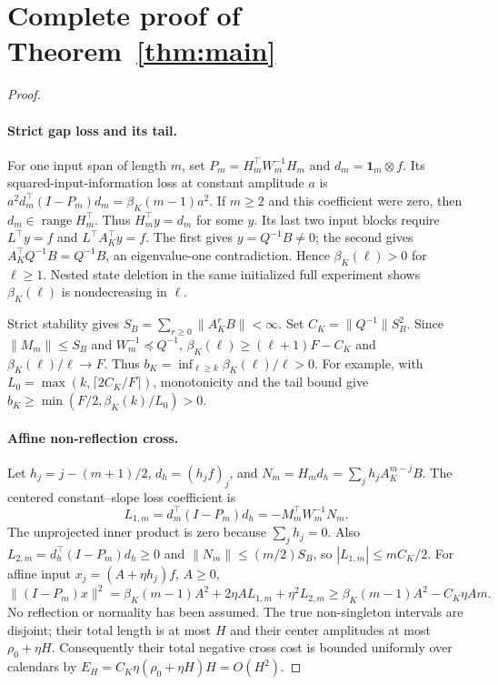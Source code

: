 \documentclass[11pt]{article}
\begin{document}
\appendix
\section{Complete proof of Theorem~\ref{thm:main}}\label{sec:proof}

\begin{proof}
\paragraph{Strict gap loss and its tail.}
For one input span of length $m$, set $P_m=H_m^\top W_m^{-1}H_m$ and
$d_m=\mathbf1_m\otimes f$.
Its squared-input-information loss at constant amplitude $a$ is
$a^2d_m^\top(I-P_m)d_m=\beta_K(m-1)a^2$.
If $m\ge2$ and this coefficient were zero, then $d_m\in\operatorname{range}H_m^\top$.
Thus $H_m^\top y=d_m$ for some $y$. Its last two input blocks require
$L^\top y=f$ and $L^\top A_K^\top y=f$.
The first gives $y=Q^{-1}B\ne0$; the second gives
$A_K^\top Q^{-1}B=Q^{-1}B$, an eigenvalue-one contradiction.
Hence $\beta_K(\ell)>0$ for $\ell\ge1$.
Nested state deletion in the same initialized full experiment shows
$\beta_K(\ell)$ is nondecreasing in $\ell$.

Strict stability gives
$S_B=\sum_{r\ge0}\|A_K^rB\|<\infty$.
Set $C_K=\|Q^{-1}\|S_B^2$.
Since $\|M_m\|\le S_B$ and $W_m^{-1}\preceq Q^{-1}$,
$\beta_K(\ell)\ge(\ell+1)F-C_K$ and $\beta_K(\ell)/\ell\to F$.
Thus $b_K=\inf_{\ell\ge k}\beta_K(\ell)/\ell>0$.
For example, with $L_0=\max(k,\lceil2C_K/F\rceil)$,
monotonicity and the tail bound give
$b_K\ge\min(F/2,\beta_K(k)/L_0)>0$.

\paragraph{Affine non-reflection cross.}
Let $h_j=j-(m+1)/2$, $d_h=(h_jf)_j$, and
$N_m=H_m d_h=\sum_jh_jA_K^{m-j}B$.
The centered constant--slope loss coefficient is
\[
L_{1,m}=d_m^\top(I-P_m)d_h=-M_m^\top W_m^{-1}N_m .
\]
The unprojected inner product is zero because $\sum_jh_j=0$.
Also $L_{2,m}=d_h^\top(I-P_m)d_h\ge0$ and
$\|N_m\|\le(m/2)S_B$, so $|L_{1,m}|\le mC_K/2$.
For affine input $x_j=(A+\eta h_j)f$, $A\ge0$,
\begin{equation}\label{eq:affine}
\| (I-P_m)x\|^2
=\beta_K(m-1)A^2+2\eta A L_{1,m}+\eta^2L_{2,m}
\ge\beta_K(m-1)A^2-C_K\eta A m .
\end{equation}
No reflection or normality has been assumed.
The true non-singleton intervals are disjoint; their total length is at most
$H$ and their center amplitudes at most $\rho_0+\eta H$.
Consequently their total negative cross cost is bounded uniformly over
calendars by $E_H=C_K\eta(\rho_0+\eta H)H=O(H^2)$.


\end{proof}
\end{document}
